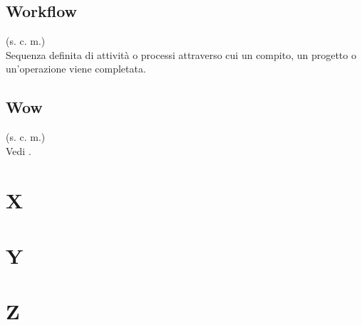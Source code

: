     \subsection{Workflow}
    (s. c. m.)\\
    Sequenza definita di attività o processi attraverso cui un compito, un progetto 
    o un'operazione viene completata.
    \subsection{Wow}
    (s. c. m.)\\
    Vedi .
\pagebreak
\section{X}
\pagebreak
\section{Y}
\pagebreak
\section{Z}
